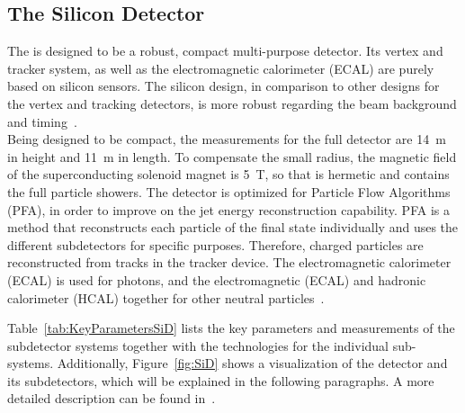 \subsection{The Silicon Detector}
\label{ILC:SiD}
The \sid is designed to be a robust, compact multi-purpose detector.
Its vertex and tracker system, as well as the electromagnetic calorimeter (ECAL) are purely based on silicon sensors.
The silicon design, in comparison to other designs for the vertex and tracking detectors, is more robust regarding the beam background and timing~\cite[cf. p. 57ff]{TDR4}.
\\Being designed to be compact, the measurements for the full detector are \SI{14}{\meter} in height and \SI{11}{\meter} in length.
To compensate the small radius, the magnetic field of the superconducting solenoid magnet is \SI{5}{\tesla}, so that \sid is hermetic and contains the full particle showers.
The detector is optimized for Particle Flow Algorithms (PFA), in order to improve on the jet energy reconstruction capability.
PFA is a method that reconstructs each particle of the final state individually and uses the different subdetectors for specific purposes. 
Therefore, charged particles are reconstructed from tracks in the tracker device.
The electromagnetic calorimeter (ECAL) is used for photons, and the electromagnetic (ECAL) and hadronic calorimeter (HCAL) together for other neutral particles~\cite{PFA}.

Table~\ref{tab:KeyParametersSiD} lists the key parameters and measurements of the \sid subdetector systems together with the technologies for the individual sub-systems. 
Additionally, Figure~\ref{fig:SiD} shows a visualization of the \sid detector and its subdetectors, which will be explained in the following paragraphs.
A more detailed description can be found in~\cite{TDR4}.

